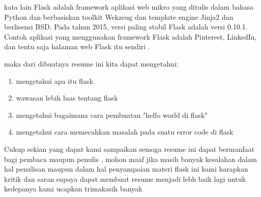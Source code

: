 \documentclass[12pt]{article}
\begin{document}
kata lain Flask adalah framework aplikasi web mikro yang ditulis dalam bahasa Python dan berbasiskan toolkit Wekzeug dan template engine Jinja2 dan berlisensi BSD. Pada tahun 2015, versi paling stabil Flask adalah versi 0.10.1. Contoh aplikasi yang menggunakan framework Flask adalah Pinterest, LinkedIn, dan tentu saja halaman web Flask itu sendiri \cite{solihin2016implementasi}. 

maka dari dibuatnya resume ini kita dapat mengetahui: 
	
\begin{enumerate}
\item mengetahui apa itu flask.
\item wawasan lebih luas tentang flask
\item mengetahui bagaimana cara pembuatan "hello world di flask"
\item mengetahui cara memecahkan masalah pada suatu error code di flask
\end{enumerate}	


Cukup sekian yang dapat kami sampaikan semoga resume ini dapat bermanfaat bagi pembaca maupun penulis , mohon maaf jika masih banyak kesalahan dalam hal penulisan maupun dalam hal penyampaian materi flask ini kami harapkan kritik dan saran supaya dapat membuat resume menjadi lebh baik lagi untuk kedepanya kami ucapkan trimakasih banyak  
\end{document}
